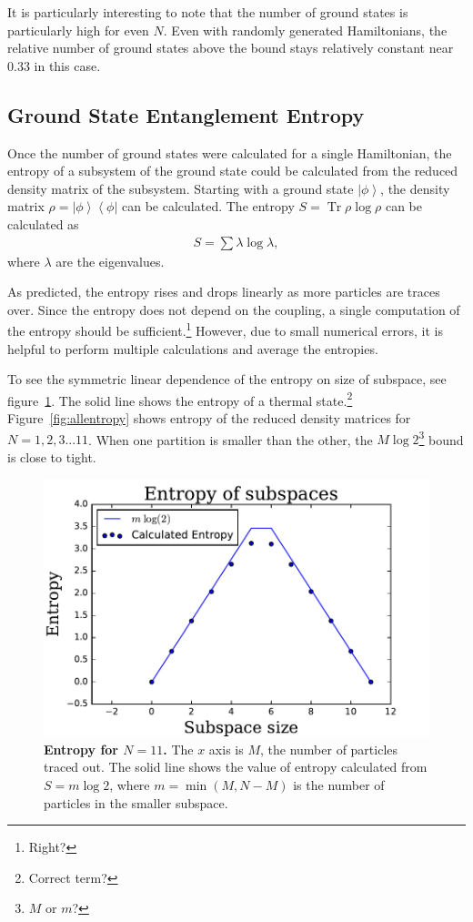 \documentclass[12pt]{article} %
\newcommand{\ket}[1]{\left|#1\right\rangle}
\newcommand{\bra}[1]{\left\langle#1\right|}
\DeclareMathOperator{\Tr}{Tr}
\begin{document}
It is particularly interesting to note that the number of ground states is particularly high for even $N$. Even with randomly generated Hamiltonians, the relative number of ground states above the bound stays relatively constant near 0.33 in this case.

\subsection{Ground State Entanglement Entropy}

Once the number of ground states were calculated for a single Hamiltonian, the entropy of a subsystem of the ground state could be calculated from the reduced density matrix of the subsystem. Starting with a ground state $\ket{\phi}$, the density matrix $\rho = \ket{\phi}\bra{\phi}$ can be calculated. The entropy $S = \Tr\rho\log\rho$ can be calculated as 
\begin{align}
S = \sum \lambda\log\lambda,
\end{align}
where $\lambda$ are the eigenvalues. 

As predicted, the entropy rises and drops linearly as more particles are traces over. Since the entropy does not depend on the coupling, a single computation of the entropy should be sufficient.\footnote{Right?} However, due to small numerical errors, it is helpful to perform multiple calculations and average the entropies. 

To see the symmetric linear dependence of the entropy on size of subspace, see figure~\ref{fig:N11pred_ent}. The solid line shows the entropy of a thermal state.\footnote{Correct term?} Figure~\ref{fig:allentropy} shows entropy of the reduced density matrices for $N = 1,2,3...11$. When one partition is smaller than the other, the $M\log2$\footnote{$M$ or $m$?} bound is close to tight. 

\begin{figure}
	\centering
	\includegraphics[width=.5\textwidth]{N11pred_ent}
	\caption{\textbf{Entropy for $N=11$.} The $x$ axis is $M$, the number of particles traced out. The solid line shows the value of entropy calculated from $S=m\log2$, where $m = \min(M,N-M)$ is the number of particles in the smaller subspace. }
	\label{fig:N11pred_ent}
\end{figure}
\end{document}

